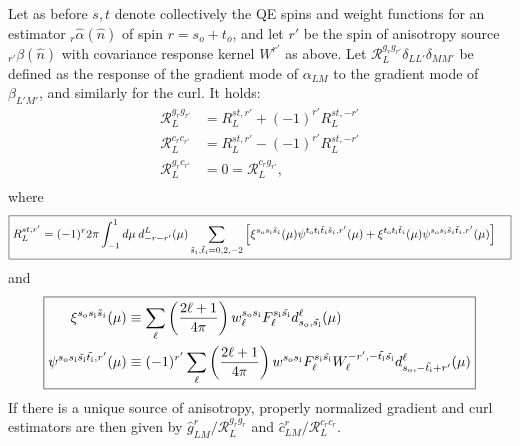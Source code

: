 \documentclass{article}
\newcommand{\si}[0]{{s_{\rm i}}}
\newcommand{\ti}[0]{{t_{\rm i}}}
\newcommand{\so}[0]{{s_{\rm o}}}
\renewcommand{\to}[0]{{t_{\rm o}}}
\newcommand{\resp}{ {\mathcal R} }
\newcommand{\hn}[0]{\hat n}
\begin{document}
Let as before $s, t$ denote collectively the QE spins and weight functions for an estimator $_r\hat \alpha(\hn)$ of spin $r = s_o + t_o$, and let $r'$ be the spin of anisotropy source $_{r'}\beta(\hn)$ with covariance response kernel $W^{r'}$ as above. Let $\mathcal R_L^{g_r g_{r'}} \delta_{LL'}\delta_{MM'}$ be defined as the response of the gradient mode of $\alpha_{LM}$ to the gradient mode of $\beta_{L'M'}$, and similarly for the curl. It holds: \begin{equation}\boxed{
	\begin{split}
		\resp^{g_rg_{r'}}_L &= R_L^{st, r'} + (-1)^{r'} R_L^{st, -r'}\\
		\resp^{c_rc_{r'}}_L &= R_L^{st, r'} - (-1)^{r'} R_L^{st, -r'} \\
		\resp^{g_rc_{r'}}_L &= 0 = \resp^{c_rg_{r'}}_L, \\
	\end{split}}
\end{equation}
where
\begin{equation}
\boxed{
\begin{split}
R_L^{st, r'} &= (-1)^{r}2\pi  \int_{-1}^1 d \mu\: d^L_{-r-r'}(\mu)\sum_{\tilde s_i,\tilde t_i = 0,2,-2}  \left[\xi^{\so \si \tilde s_i} (\mu)\psi^{\to \ti \tilde t_i \tilde s_i, r' }(\mu) +  \xi^{\to \ti \tilde t_i}(\mu) \psi^{\so \si \tilde s_i \tilde t_i, r' }(\mu) \right]
\end{split}}
\end{equation}
and
\begin{equation}
\boxed{
\begin{split}
\xi^{\so\si \tilde s_i}(\mu) &\equiv  \sum_\ell \left(\frac{2\ell + 1}{4\pi}\right)w^{\so\si}_\ell F_\ell^{\si \tilde \si} d^\ell_{\so,\tilde \si}(\mu) \\
\psi^{\so\si \tilde \si \tilde \ti, r'}(\mu) &\equiv  (-1)^{r'} \sum_\ell \left(\frac{2\ell + 1}{4\pi}\right)w^{\so \si}F^{\si \tilde \si}_\ell W_\ell^{-r', -\tilde \ti \tilde \si} d^\ell_{\so,-\tilde \ti + r'}(\mu) 
\end{split}}
\end{equation}
If there is a unique source of anisotropy, properly normalized gradient and curl estimators are then given by $\hat g^r_{LM} / \mathcal R_L^{g_rg_r}$ and $\hat c^r_{LM} / \mathcal R_L^{c_r c_r}$.
\end{document}
